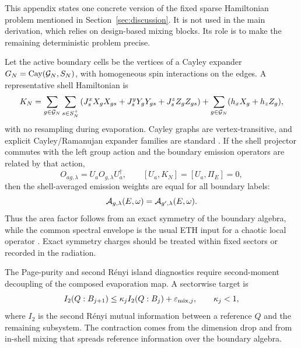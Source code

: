 \documentclass[12pt]{article}
\begin{document}
This appendix states one concrete version of the fixed sparse Hamiltonian
problem mentioned in Section~\ref{sec:discussion}.  It is not used in the main
derivation, which relies on design-based mixing blocks.  Its role is to make
the remaining deterministic problem precise.

Let the active boundary cells be the vertices of a Cayley expander
$G_N={\rm Cay}({\cal G}_N,S_N)$, with homogeneous spin interactions on the
edges.  A representative shell Hamiltonian is
\begin{equation}
    K_N=
    \sum_{g\in{\cal G}_N}\sum_{s\in S_N^+}
    \left(
    J_s^xX_gX_{gs}+J_s^yY_gY_{gs}+J_s^zZ_gZ_{gs}
    \right)
    +\sum_{g\in{\cal G}_N}(h_xX_g+h_zZ_g),
\end{equation}
with no resampling during evaporation.  Cayley graphs are vertex-transitive,
and explicit Cayley/Ramanujan expander families are standard
\cite{LubotzkyPhillipsSarnak1988,Harrow2008}.  If the shell projector commutes
with the left group action and the boundary emission operators are related by
that action,
\begin{equation}
    O_{ag,\lambda}=U_aO_{g,\lambda}U_a^\dagger,\qquad
    [U_a,K_N]=[U_a,\Pi_E]=0,
\end{equation}
then the shell-averaged emission weights are equal for all boundary labels:
\begin{equation}
    {\cal A}_{g,\lambda}(E,\omega)
    =
    {\cal A}_{g',\lambda}(E,\omega).
\end{equation}
Thus the area factor follows from an exact symmetry of the boundary algebra,
while the common spectral envelope is the usual ETH input for a chaotic local
operator \cite{Srednicki1994,DAlessioKafriPolkovnikovRigol2016,
DymarskyLashkariLiu2018}.  Exact symmetry charges should be treated within
fixed sectors or recorded in the radiation.

The Page-purity and second R\'enyi island diagnostics require second-moment
decoupling of the composed evaporation map.  A sectorwise target is
\begin{equation}
    I_2(Q:B_{j+1})
    \le
    \kappa_j I_2(Q:B_j)+\varepsilon_{{\rm mix},j},
    \qquad
    \kappa_j<1,
\end{equation}
where $I_2$ is the second R\'enyi mutual information between a reference $Q$
and the remaining subsystem.  The contraction comes from the dimension drop
and from in-shell mixing that spreads reference information over the boundary
algebra.
\end{document}
